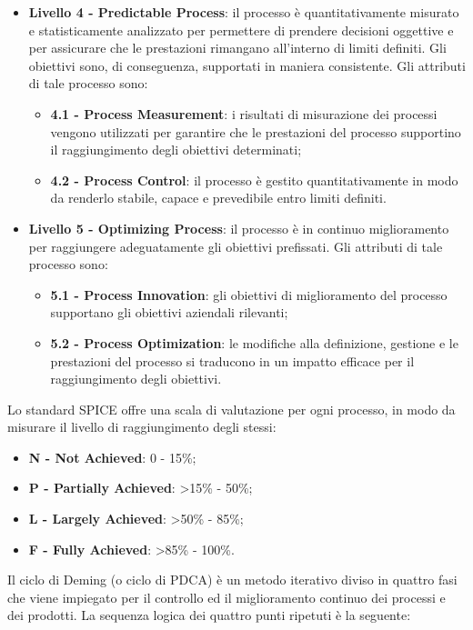 \begin{itemize}
\begin{itemize}
	\end{itemize}
	\item \textbf {Livello 4 - Predictable Process}: il processo è quantitativamente misurato e statisticamente analizzato per permettere di prendere decisioni oggettive e per assicurare che le prestazioni rimangano all'interno di limiti definiti. Gli obiettivi sono, di conseguenza, supportati in maniera consistente. Gli attributi di tale processo sono:
	\begin{itemize}
		\item \textbf{4.1 - Process Measurement}: i risultati di misurazione dei processi vengono utilizzati per garantire che le prestazioni del processo supportino il raggiungimento degli obiettivi determinati;
		\item \textbf{4.2 - Process Control}: il processo è gestito quantitativamente in modo da renderlo stabile, capace e prevedibile entro limiti definiti.
	\end{itemize}
	\item \textbf {Livello 5 - Optimizing Process}: il processo è in continuo miglioramento per raggiungere adeguatamente gli obiettivi prefissati. Gli attributi di tale processo sono:
	\begin{itemize}
		\item \textbf{5.1 - Process Innovation}: gli obiettivi di miglioramento del processo supportano gli obiettivi aziendali rilevanti;
		\item \textbf{5.2 - Process Optimization}: le modifiche alla definizione, gestione e le prestazioni del processo si traducono in un impatto efficace per il raggiungimento degli obiettivi.
	\end{itemize}
\end{itemize}

Lo standard SPICE offre una scala di valutazione per ogni processo, in modo da misurare il livello di raggiungimento degli stessi:
\begin{itemize}
	\item \textbf{N - Not Achieved}: 0 - 15\%;
	\item \textbf{P - Partially Achieved}: >15\% - 50\%;
	\item \textbf{L - Largely Achieved}: >50\% - 85\%;
	\item \textbf{F - Fully Achieved}: >85\% - 100\%.
\end{itemize}
\newpage
{}
Il ciclo di Deming (o ciclo di PDCA) è un metodo iterativo diviso in quattro fasi che viene impiegato per il controllo ed il miglioramento continuo dei processi e dei prodotti. La sequenza logica dei quattro punti ripetuti è la seguente:


